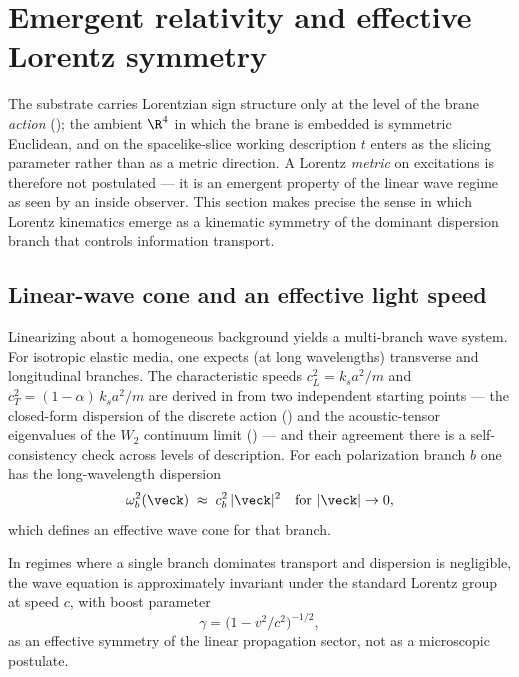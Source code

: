 \section{Emergent relativity and effective Lorentz symmetry}
\label{sec:emergent-relativity}

The substrate carries Lorentzian sign structure only at the level of the brane \emph{action} (); the ambient $\R^4$ in which the brane is embedded is symmetric Euclidean, and on the spacelike-slice working description $t$ enters as the slicing parameter rather than as a metric direction.
A Lorentz \emph{metric} on excitations is therefore not postulated --- it is an emergent property of the linear wave regime as seen by an inside observer.
This section makes precise the sense in which Lorentz kinematics emerge as a kinematic symmetry of the dominant dispersion branch that controls information transport.

\subsection{Linear-wave cone and an effective light speed}

Linearizing  about a homogeneous background yields a multi-branch wave system.
For isotropic elastic media, one expects (at long wavelengths) transverse and longitudinal branches.
The characteristic speeds $c_L^2 = k_s a^2/m$ and $c_T^2 = (1-\alpha)\,k_s a^2/m$ are derived
in  from two independent starting points --- the closed-form dispersion
of the discrete action () and the acoustic-tensor eigenvalues of the $W_2$
continuum limit () --- and their agreement there is a self-consistency
check across levels of description.
For each polarization branch $b$ one has the long-wavelength dispersion
\begin{equation}
  \omega_b^2(\veck)\;\approx\; c_b^2\,|\veck|^2 \quad \text{for } |\veck|\to 0,
  \label{eq:linear-dispersion}
\end{equation}
which defines an effective wave cone for that branch.

In regimes where a single branch dominates transport and dispersion is negligible,
the wave equation is approximately invariant under the standard Lorentz group at speed $c$,
with boost parameter
\begin{equation}
  \gamma = \bigl(1-v^2/c^2\bigr)^{-1/2},
  \label{eq:lorentz}
\end{equation}
as an effective symmetry of the linear propagation sector, not as a microscopic postulate.

